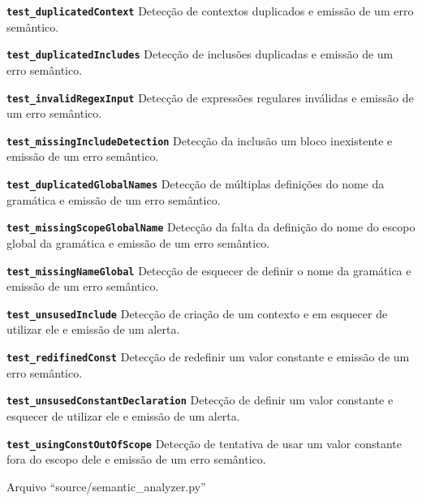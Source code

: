 \begin{enumerateoptional}[1.]
    \item[\bfseries\texttt{test_duplicatedContext}] Detecção de contextos duplicados e
    emissão de um erro semântico.

    \item[\bfseries\texttt{test_duplicatedIncludes}] Detecção de inclusões duplicadas  e
    emissão de um erro semântico.

    \item[\bfseries\texttt{test_invalidRegexInput}] Detecção de expressões regulares inválidas e
    emissão de um erro semântico.

    \item[\bfseries\texttt{test_missingIncludeDetection}] Detecção da inclusão um bloco inexistente e
    emissão de um erro semântico.

    \item[\bfseries\texttt{test_duplicatedGlobalNames}] Detecção de múltiplas definições do nome da gramática e
    emissão de um erro semântico.

    \item[\bfseries\texttt{test_missingScopeGlobalName}] Detecção da falta da definição do nome do escopo global da gramática e
    emissão de um erro semântico.

    \item[\bfseries\texttt{test_missingNameGlobal}] Detecção de esquecer de definir o nome da gramática e
    emissão de um erro semântico.

    \item[\bfseries\texttt{test_unsusedInclude}] Detecção de criação de um contexto e
    em esquecer de utilizar ele e
    emissão de um alerta.

    \item[\bfseries\texttt{test_redifinedConst}] Detecção de redefinir um valor constante e
    emissão de um erro semântico.

    \item[\bfseries\texttt{test_unsusedConstantDeclaration}] Detecção de definir um valor constante e esquecer de utilizar ele e
    emissão de um alerta.

    \item[\bfseries\texttt{test_usingConstOutOfScope}] Detecção de tentativa de usar um valor constante fora do escopo dele e
    emissão de um erro semântico.
\end{enumerateoptional}%
\begin{code}
\caption{Arquivo ``source/semantic\_analyzer.py''}
\label{semanticAnalyzerPy}
\inputminted{python3}{../source/semantic_analyzer.py}
\end{code}


